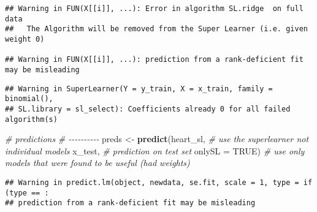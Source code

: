 \documentclass[
]{article}
\newenvironment{Shaded}{\begin{snugshade}}{\end{snugshade}}
\newcommand{\AttributeTok}[1]{\textcolor[rgb]{0.13,0.29,0.53}{#1}}
\newcommand{\CommentTok}[1]{\textcolor[rgb]{0.56,0.35,0.01}{\textit{#1}}}
\newcommand{\ConstantTok}[1]{\textcolor[rgb]{0.56,0.35,0.01}{#1}}
\newcommand{\DecValTok}[1]{\textcolor[rgb]{0.00,0.00,0.81}{#1}}
\newcommand{\FunctionTok}[1]{\textcolor[rgb]{0.13,0.29,0.53}{\textbf{#1}}}
\newcommand{\NormalTok}[1]{#1}
\newcommand{\OtherTok}[1]{\textcolor[rgb]{0.56,0.35,0.01}{#1}}
\newcommand{\SpecialCharTok}[1]{\textcolor[rgb]{0.81,0.36,0.00}{\textbf{#1}}}
\newcommand{\StringTok}[1]{\textcolor[rgb]{0.31,0.60,0.02}{#1}}
\begin{document}
\begin{verbatim}
## Warning in FUN(X[[i]], ...): Error in algorithm SL.ridge  on full data 
##   The Algorithm will be removed from the Super Learner (i.e. given weight 0)

## Warning in FUN(X[[i]], ...): prediction from a rank-deficient fit may be misleading
\end{verbatim}

\begin{verbatim}
## Warning in SuperLearner(Y = y_train, X = x_train, family = binomial(),
## SL.library = sl_select): Coefficients already 0 for all failed algorithm(s)
\end{verbatim}

\begin{Shaded}
\begin{Highlighting}[]
\CommentTok{\# predictions}
\CommentTok{\# {-}{-}{-}{-}{-}{-}{-}{-}{-}{-}}
\NormalTok{preds }\OtherTok{\textless{}{-}} 
  \FunctionTok{predict}\NormalTok{(heart\_sl,             }\CommentTok{\# use the superlearner not individual models}
\NormalTok{          x\_test,         }\CommentTok{\# prediction on test set}
          \AttributeTok{onlySL =} \ConstantTok{TRUE}\NormalTok{)  }\CommentTok{\# use only models that were found to be useful (had weights)}
\end{Highlighting}
\end{Shaded}

\begin{verbatim}
## Warning in predict.lm(object, newdata, se.fit, scale = 1, type = if (type == :
## prediction from a rank-deficient fit may be misleading
\end{verbatim}

\begin{Shaded}
\end{Shaded}
\end{document}
